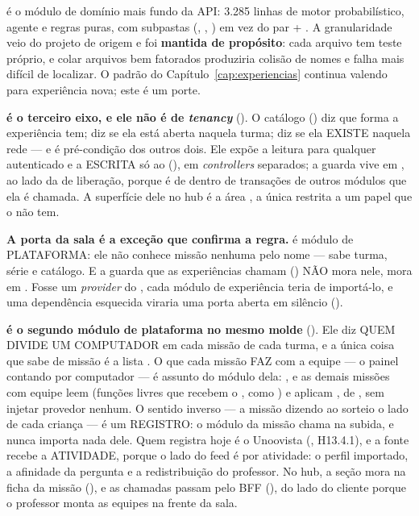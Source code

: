 \begin{regra}
\begin{nota}
 é o módulo de domínio mais fundo da API: 3.285 linhas de motor
probabilístico, agente e regras puras, com subpastas (,
, ) em vez do par  +
. A granularidade veio do projeto de origem e foi \textbf{mantida
de propósito}: cada arquivo tem teste próprio, e colar arquivos bem fatorados
produziria colisão de nomes e falha mais difícil de localizar. O padrão do
Capítulo~\ref{cap:experiencias} continua valendo para experiência nova; este é um
porte.
\end{nota}

\textbf{ é o terceiro eixo, e ele não é de \emph{tenancy}}
(). O catálogo () diz que forma a experiência
tem;  diz se ela está aberta naquela turma;  diz se
ela EXISTE naquela rede --- e é pré-condição dos outros dois. Ele expõe a
leitura para qualquer autenticado e a ESCRITA só ao  (),
em \emph{controllers} separados; a guarda vive em , ao lado da de
liberação, porque é de dentro de transações de outros módulos que ela é chamada.
A superfície dele no hub é a área , a única restrita a um papel
que o  não tem.

\textbf{A porta da sala é a exceção que confirma a regra.}  é módulo de
PLATAFORMA: ele não conhece missão nenhuma pelo nome --- sabe turma, série e
catálogo. E a guarda que as experiências chamam () NÃO
mora nele, mora em . Fosse um \emph{provider} do
, cada módulo de experiência teria de importá-lo, e uma dependência
esquecida viraria uma porta aberta em silêncio ().

\textbf{ é o segundo módulo de plataforma no mesmo molde}
(). Ele diz QUEM DIVIDE UM COMPUTADOR em cada missão de cada
turma, e a única coisa que sabe de missão é a lista
. O que cada missão FAZ com a equipe --- o painel
contando por computador --- é assunto do módulo dela: ,
 e as demais missões com equipe leem  (funções livres que recebem o
, como ) e aplicam , de
, sem injetar provedor nenhum. O sentido inverso --- a
missão dizendo ao sorteio o lado de cada criança --- é um REGISTRO: o módulo da
missão chama  na subida, e
 nunca importa nada dele. Quem registra hoje é o Unoovista
(, H13.4.1), e a fonte recebe a ATIVIDADE, porque o
lado do feed é por atividade: o perfil importado, a afinidade da pergunta e a
redistribuição do professor. No hub, a seção mora na ficha da missão
(), e as chamadas passam pelo BFF
(), do lado do cliente porque o professor monta
as equipes na frente da sala.


\end{regra}
